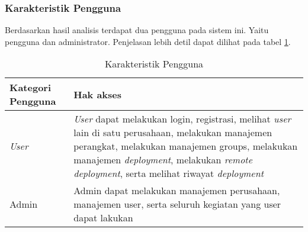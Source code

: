 \subsubsection{Karakteristik Pengguna}
Berdasarkan hasil analisis terdapat dua pengguna pada sistem ini. Yaitu pengguna dan administrator. Penjelasan lebih detil dapat dilihat pada tabel \ref{tab:karakteristik-pengguna}.

\bgroup
\begin{table}[ht]
  \def\arraystretch{1.7}
  \caption{Karakteristik Pengguna}
  \label{tab:karakteristik-pengguna}
  \centering
  \begin{tabular}{|p{2cm}|p{8cm}|}
    \hline
    Kategori Pengguna & Hak akses                                                                                                                                                                                                                                                                           \\
    \hline
    \textit{User}     & \textit{User} dapat melakukan login, registrasi, melihat \textit{user} lain di satu perusahaan, melakukan manajemen perangkat, melakukan manajemen groups, melakukan manajemen \textit{deployment}, melakukan \textit{remote deployment}, serta melihat riwayat \textit{deployment} \\
    \hline
    Admin             & Admin dapat melakukan manajemen perusahaan, manajemen user, serta seluruh kegiatan yang user dapat lakukan                                                                                                                                                                          \\
    \hline
  \end{tabular}
\end{table}
\egroup
